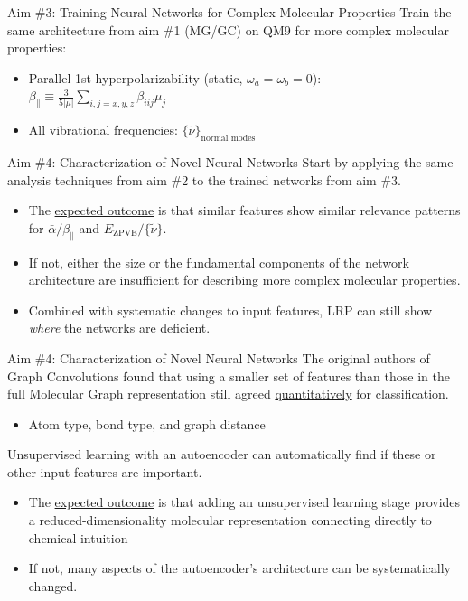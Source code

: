 \documentclass[compress]{beamer}
\begin{document}

\begin{frame}{Aim \#3: Training Neural Networks for Complex Molecular Properties}
  Train the same architecture from aim \#1 (MG/GC) on QM9 for more complex molecular properties:
  \begin{itemize}
  \item Parallel 1st hyperpolarizability (static, \(\omega_{a} = \omega_{b} = 0\)): \(\beta_{\parallel} \equiv \frac{3}{5|\mu|} \sum_{i,j=x,y,z} \beta_{iij} \mu_{j}\)
  \item All vibrational frequencies: \(\{\tilde{\nu}\}_{\text{normal modes}}\)
  \end{itemize}
\end{frame}

\begin{frame}{Aim \#4: Characterization of Novel Neural Networks}
  Start by applying the same analysis techniques from aim \#2 to the trained networks from aim \#3.
  \begin{itemize}
  \item The \underline{expected outcome} is that similar features show similar relevance patterns for \(\bar{\alpha}/\beta_{\parallel}\) and \(E_{\text{ZPVE}}/\{\tilde{\nu}\}\).
  \item If not, either the size or the fundamental components of the network architecture are insufficient for describing more complex molecular properties.
  \item Combined with systematic changes to input features, LRP can still show \emph{where} the networks are deficient.
  \end{itemize}
\end{frame}

\begin{frame}{Aim \#4: Characterization of Novel Neural Networks}
  The original authors of Graph Convolutions found that using a smaller set of features than those in the full Molecular Graph representation still agreed \underline{quantitatively} for classification.
  \begin{itemize}
  \item Atom type, bond type, and graph distance
  \end{itemize}
  Unsupervised learning with an autoencoder can automatically find if these or other input features are important.
  \begin{itemize}
  \item The \underline{expected outcome} is that adding an unsupervised learning stage provides a reduced-dimensionality molecular representation connecting directly to chemical intuition
  \item If not, many aspects of the autoencoder's architecture can be systematically changed.
  \end{itemize}
\end{frame}
\end{document}

